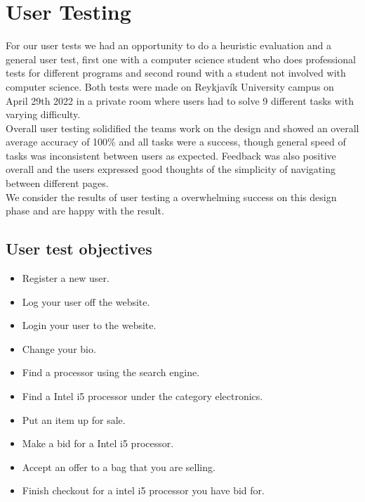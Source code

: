 \section{User Testing}

For our user tests we had an opportunity to do a heuristic evaluation and a general user test, first one with a computer science student who does professional tests for different programs and second round with a student not involved with computer science. Both tests were made on Reykjavík University campus on April 29th 2022 in a private room where users had to solve 9 different tasks with varying difficulty.\\

Overall user testing solidified the teams work on the design and showed an overall average accuracy of 100\% and all tasks were a success, though general speed of tasks was inconsistent between users as expected. Feedback was also positive overall and the users expressed good thoughts of the simplicity of navigating between different pages.\\

We consider the results of user testing a overwhelming success on this design phase and are happy with the result.\\

\subsection{User test objectives}
\begin{itemize}
    \item Register a new user.
    \item Log your user off the website.
    \item Login your user to the website.
    \item Change your bio.
    \item Find a processor using the search engine.
    \item Find a Intel i5 processor under the category electronics.
    \item Put an item up for sale.
    \item Make a bid for a Intel i5 processor.
    \item Accept an offer to a bag that you are selling.
    \item Finish checkout for a intel i5 processor you have bid for.
\end{itemize}